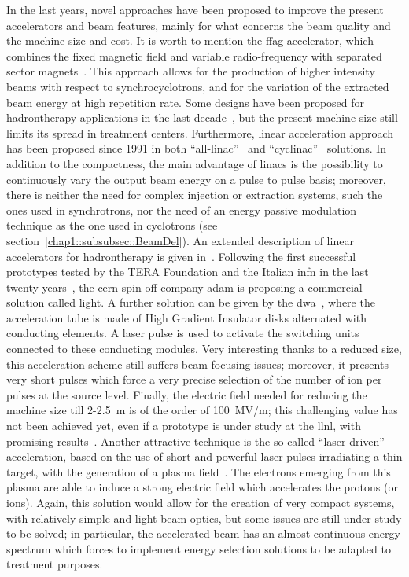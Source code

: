 In the last years, novel approaches have been proposed  to improve the present accelerators and beam features, mainly for what concerns the beam quality and the machine size and cost. It is worth to mention the \gls{ffag} accelerator, which combines the fixed magnetic field and variable radio-frequency with separated sector magnets~\parencite{Sheehy2016}. This approach allows for the production of higher intensity beams with respect to synchrocyclotrons, and for the variation of the extracted beam energy at high repetition rate. Some designs have been proposed for hadrontherapy applications in the last decade~\parencite{Antoine2009, Peach2010}, but the present machine size still limits its spread in treatment centers. 
Furthermore, linear acceleration approach has been proposed since 1991 in both \enquote{all-linac}~\parencite{Lennox1991, Hamm1991} and \enquote{cyclinac}~\parencite{Amaldi2009b} solutions. In addition to the compactness, the main advantage of linacs is the possibility to continuously vary the output beam energy on a pulse to pulse basis; moreover, there is neither the need for complex injection or extraction systems, such the ones used in synchrotrons, nor the need of an energy passive modulation technique as the one used in cyclotrons (see section~\ref{chap1::subsubsec::BeamDel}). An extended description of linear accelerators for hadrontherapy is given in~\cite{Amaldi2009a}. Following the first successful prototypes tested by the TERA Foundation and the Italian \gls{infn} in the last twenty years~\parencite{Amaldi2004, Ronsivalle2011}, the \gls{cern} spin-off company \gls{adam} is proposing a commercial solution called \gls{light}. A further solution can be given by the \gls{dwa}~\parencite{Caporaso2009}, where the acceleration tube is made of High Gradient Insulator disks alternated with conducting elements. A laser pulse is used to activate the switching units connected to these conducting modules. Very interesting thanks to a reduced size, this acceleration scheme still suffers beam focusing issues; moreover, it presents very short pulses which force a very precise selection of the number of ion per pulses at the source level. Finally, the electric field needed for reducing the machine size till 2-2.5~m is of the order of 100~MV/m; this challenging value has not been achieved yet, even if a prototype is under study at the \gls{llnl}, with promising results~\parencite{Hettler2013, Zografos2013}. Another attractive technique is the so-called \enquote{laser driven} acceleration, based on the use of short and powerful laser pulses irradiating a thin target, with the generation of a plasma field~\parencite{Tajima2009}. The electrons emerging from this plasma are able to induce a strong electric field which accelerates the protons (or ions). Again, this solution would allow for the creation of very compact systems, with relatively simple and light beam optics, but some issues are still under study to be solved; in particular, the accelerated beam has an almost continuous energy spectrum which forces to implement energy selection solutions to be adapted to treatment purposes. 

